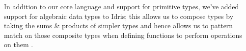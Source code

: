 In addition to our core language and support for primitive types, we've added support for algebraic data types to Idris;
this allows us to compose types by taking the sums \& products of simpler types and hence allows us to pattern match on those composite types
when defining functions to perform operations on them \cite{haskellwiki2014}.
